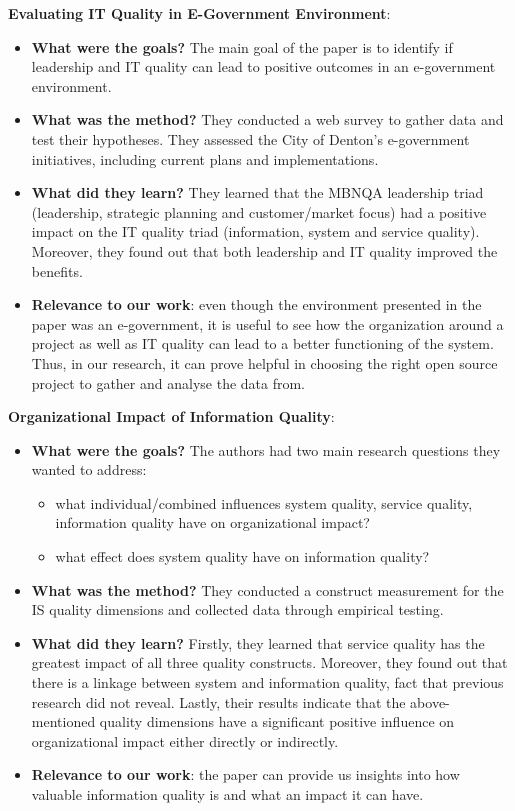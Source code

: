 \documentclass{mprop}
\begin{document}
\textbf{Evaluating IT Quality in E-Government 
        Environment}\cite{prybutok2008evaluating}:
\begin{itemize}
  \item \textbf{What were the goals?}
    The main goal of the paper is to identify if leadership and IT quality
    can lead to positive outcomes in an e-government environment.
  \item \textbf{What was the method?}
    They conducted a web survey to gather data and test their hypotheses. They
    assessed the City of Denton's e-government initiatives, including current 
    plans and implementations.
  \item \textbf{What did they learn?}
    They learned that the MBNQA leadership triad (leadership, strategic
    planning and customer/market focus) had a positive impact on the IT quality
    triad (information, system and service quality). Moreover, they found out
    that both leadership and IT quality improved the benefits.
  \item \textbf{Relevance to our work}: even though the environment presented
    in the paper was an e-government, it is useful to see how the organization 
    around a project as well as IT quality can lead to a better functioning of the 
    system. Thus, in our research, it can prove helpful in choosing the right 
    open source project to gather and analyse the data from.
\end{itemize}

\textbf{Organizational Impact of 
        Information Quality}\cite{gorla2010organizational}:
\begin{itemize}
  \item \textbf{What were the goals?}
    The authors had two main research questions they wanted to address:
      \begin{itemize}
        \item what individual/combined influences system quality, service quality,
          information quality have on organizational impact?
        \item what effect does system quality have on information quality?
      \end{itemize}
  \item \textbf{What was the method?}
    They conducted a construct measurement for the IS quality dimensions and 
    collected data through empirical testing.
  \item \textbf{What did they learn?}
    Firstly, they learned that service quality has the greatest impact 
    of all three quality constructs. Moreover, they found out that there is a 
    linkage between system and information quality, fact that previous research
    did not reveal. Lastly, their results indicate that the above-mentioned 
    quality dimensions have a significant positive influence on organizational
    impact either directly or indirectly.
  \item \textbf{Relevance to our work}: the paper can provide us insights into
    how valuable information quality is and what an impact it can have.
\end{itemize}
\end{document}
